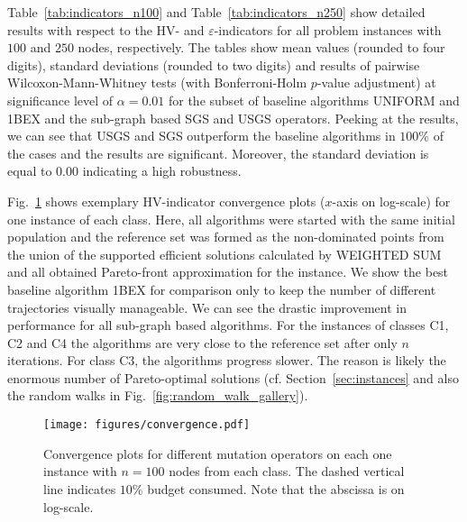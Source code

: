 \documentclass[twoside]{article}
\begin{document}
\begin{landscape}

\end{landscape}

\begin{landscape}

\end{landscape}

Table~\ref{tab:indicators_n100} and Table~\ref{tab:indicators_n250} show detailed results with respect to the HV- and $\varepsilon$-indicators for all problem instances with $100$ and $250$ nodes, respectively. The tables show mean values (rounded to four digits), standard deviations (rounded to two digits) and results of pairwise Wilcoxon-Mann-Whitney tests (with Bonferroni-Holm $p$-value adjustment) at significance level of $\alpha=0.01$ for the subset of baseline algorithms UNIFORM and 1BEX and the sub-graph based SGS and  USGS operators. Peeking at the results, we can see that USGS and SGS outperform the baseline algorithms in $100\%$ of the cases and the results are significant. Moreover, the standard deviation is equal to $0.00$ indicating a high robustness.

Fig.~\ref{fig:convergence} shows exemplary HV-indicator convergence plots ($x$-axis on log-scale) for one instance of each class. Here, all algorithms were started with the same initial population and the reference set was formed as the non-dominated points from the union of the supported efficient solutions calculated by WEIGHTED SUM and all obtained Pareto-front approximation for the instance.
We show the best baseline algorithm 1BEX for comparison only to keep the number of different trajectories visually manageable. We can see the drastic improvement in performance for all sub-graph based algorithms. For the instances of classes C1, C2 and C4 the algorithms are very close to the reference set after only $n$ iterations. For class C3, the algorithms progress slower. The reason is likely the enormous number of Pareto-optimal solutions (cf. Section~\ref{sec:instances} and also the random walks in Fig.~\ref{fig:random_walk_gallery}). 

\begin{figure}[t]
    \centering
    \texttt{[image: figures/convergence.pdf]}
    \caption{Convergence plots for different mutation operators on each one instance with $n = 100$ nodes from each class. The dashed vertical line indicates $10\%$ budget consumed. Note that the abscissa is on log-scale.}
    \label{fig:convergence}
\end{figure}
\end{document}
